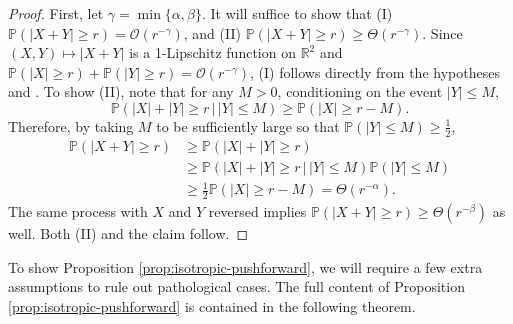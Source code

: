 \documentclass[twoside]{article}
\theoremstyle{definition}
\theoremstyle{remark}
\begin{document}
{\begin{proof}
First, let $\gamma=\min\{\alpha,\beta\}$. It will suffice to show that (I) $\mathbb{P}(|X+Y|\geq r)=\mathcal{O}(r^{-\gamma})$, and (II) $\mathbb{P}(|X+Y|\geq r)\geq\Theta(r^{-\gamma})$. Since $(X,Y)\mapsto|X+Y|$ is a 1-Lipschitz function on $\mathbb{R}^{2}$ and $\mathbb{P}(|X|\geq r)+\mathbb{P}(|Y|\geq r)=\mathcal{O}(r^{-\gamma})$, (I) follows directly from the hypotheses and \cite[Proposition 1.11]{ledoux2001concentration}. To show (II), note that for any $M>0$, conditioning on the event $|Y|\leq M$,\[
\mathbb{P}\left(\left|X\right|+|Y|\geq r\,\vert\,|Y|\leq M\right)\geq\mathbb{P}\left(\left|X\right|\geq r-M\right).
\]
Therefore, by taking $M$ to be sufficiently large so that $\mathbb{P}(|Y|\leq M)\geq\frac{1}{2}$,
\begin{align*}
\mathbb{P}\left(|X+Y|\geq r\right)&\geq\mathbb{P}\left(|X|+|Y|\geq r\right)\\
&\geq\mathbb{P}\left(\left|X\right|+|Y|\geq r\,\vert\,|Y|\leq M\right)\mathbb{P}\left(\left|Y\right|\leq M\right)\\
&\geq\frac{1}{2}\mathbb{P}\left(\left|X\right|\geq r-M\right)=\Theta(r^{-\alpha}).
\end{align*}
The same process with $X$ and $Y$ reversed implies $\mathbb{P}(|X+Y|\geq r)\geq\Theta(r^{-\beta})$ as well. Both (II) and the claim follow.
\end{proof}

To show Proposition \ref{prop:isotropic-pushforward}, we will require a few extra assumptions to rule out pathological cases. The full content of Proposition \ref{prop:isotropic-pushforward} is contained in the following theorem.

}
\end{document}
